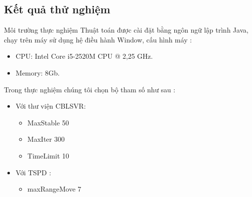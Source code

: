 \documentclass[compress]{beamer}
\begin{document}
\subsection{Kết quả thử nghiệm}
\begin{frame}{Môi trường thực nghiệm}
Thuật toán được cài đặt bằng ngôn ngữ lập trình Java, chạy trên máy sử dụng hệ điều hành Window, cấu hình máy :
\begin{itemize}
\item CPU: Intel Core i5-2520M CPU @ 2,25 GHz.
\item Memory: 8Gb.
\end{itemize}
Trong thực nghiệm chúng tôi chọn bộ tham số như sau : 
\begin{itemize}
\item Với thư viện CBLSVR: \begin{itemize}
\item MaxStable 50
\item MaxIter 300
\item TimeLimit 10
\end{itemize}
\item Với TSPD : \begin{itemize}
\item maxRangeMove 7
\end{itemize}
\end{itemize}
\end{frame}
\end{document}
